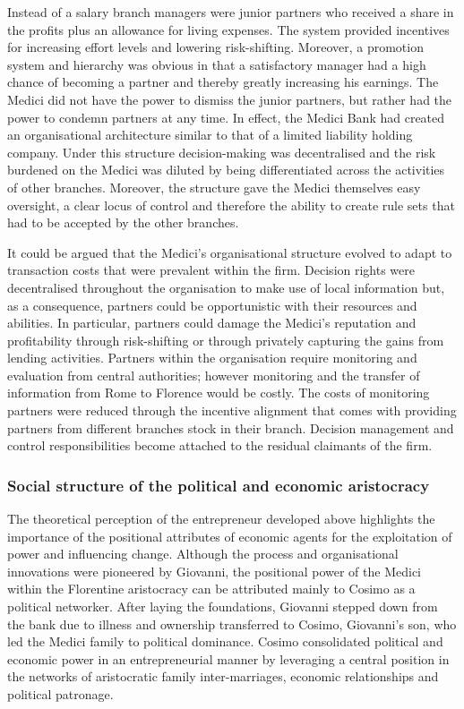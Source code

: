 Instead of a salary branch managers were junior partners who received a share in the profits plus an allowance for living expenses. The system provided incentives for increasing effort levels and lowering risk-shifting. Moreover, a promotion system and hierarchy was obvious in that a satisfactory manager had a high chance of becoming a partner and thereby greatly increasing his earnings. The Medici did not have the power to dismiss the junior partners, but rather had the power to condemn partners at any time. In effect, the Medici Bank had created an organisational architecture similar to that of a limited liability holding company. Under this structure decision-making was decentralised and the risk burdened on the Medici was diluted by being differentiated across the activities of other branches. Moreover, the structure gave the Medici themselves easy oversight, a clear locus of control and therefore the ability to create rule sets that had to be accepted by the other branches.

It could be argued that the Medici's organisational structure evolved to adapt to transaction costs that were prevalent within the firm. Decision rights were decentralised throughout the organisation to make use of local information but, as a consequence, partners could be opportunistic with their resources and abilities. In particular, partners could damage the Medici's reputation and profitability through risk-shifting or through privately capturing the gains from lending activities. Partners within the organisation require monitoring and evaluation from central authorities; however monitoring and the transfer of information from Rome to Florence would be costly. The costs of monitoring partners were reduced through the incentive alignment that comes with providing partners from different branches stock in their branch. Decision management and control responsibilities become attached to the residual claimants of the firm.

\subsubsection{Social structure of the political and economic aristocracy}

The theoretical perception of the entrepreneur developed above highlights the importance of the positional attributes of economic agents for the exploitation of power and influencing change. Although the process and organisational innovations were pioneered by Giovanni, the positional power of the Medici within the Florentine aristocracy can be attributed mainly to Cosimo as a political networker. After laying the foundations, Giovanni stepped down from the bank due to illness and ownership transferred to Cosimo, Giovanni's son, who led the Medici family to political dominance. Cosimo consolidated political and economic power in an entrepreneurial manner by leveraging a central position in the networks of aristocratic family inter-marriages, economic relationships and political patronage. 

